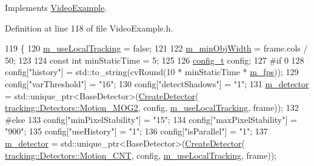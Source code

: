 Implements \mbox{\hyperlink{class_video_example_a93e23d64075fb2f508423e45d15c5421}{Video\+Example}}.



Definition at line 118 of file Video\+Example.\+h.


\begin{DoxyCode}
119     \{
120         \mbox{\hyperlink{class_video_example_a951ee017c4fbb180dfc965a9a35ac69f}{m\_useLocalTracking}} = \textcolor{keyword}{false};
121 
122         \mbox{\hyperlink{class_motion_detector_example_a1ea131c2071f3a7dd87b6c47cdaf997e}{m\_minObjWidth}} = frame.cols / 50;
123 
124         \textcolor{keyword}{const} \textcolor{keywordtype}{int} minStaticTime = 5;
125 
126         \mbox{\hyperlink{defines_8h_a81d657237a541d02f8eeefdd40191920}{config\_t}} config;
127 \textcolor{preprocessor}{#if 0}
128         config[\textcolor{stringliteral}{"history"}] = std::to\_string(cvRound(10 * minStaticTime * \mbox{\hyperlink{class_video_example_ae8110012f8d57f39d6355377cf20fb27}{m\_fps}}));
129         config[\textcolor{stringliteral}{"varThreshold"}] = \textcolor{stringliteral}{"16"};
130         config[\textcolor{stringliteral}{"detectShadows"}] = \textcolor{stringliteral}{"1"};
131         \mbox{\hyperlink{class_video_example_a00fee4b18b68d605b87051f3bdaa1c92}{m\_detector}} = std::unique\_ptr<BaseDetector>(\mbox{\hyperlink{_base_detector_8cpp_a7648f35ed8e9d0160414d8e0eaf99c15}{CreateDetector}}(
      \mbox{\hyperlink{namespacetracking_a1edf574df68abf048988b7cbacc52760a44ff25b64c66d3d3700ffbfa5b8b9330}{tracking::Detectors::Motion\_MOG2}}, config, 
      \mbox{\hyperlink{class_video_example_a951ee017c4fbb180dfc965a9a35ac69f}{m\_useLocalTracking}}, frame));
132 \textcolor{preprocessor}{#else}
133         config[\textcolor{stringliteral}{"minPixelStability"}] = \textcolor{stringliteral}{"15"};
134         config[\textcolor{stringliteral}{"maxPixelStability"}] = \textcolor{stringliteral}{"900"};
135         config[\textcolor{stringliteral}{"useHistory"}] = \textcolor{stringliteral}{"1"};
136         config[\textcolor{stringliteral}{"isParallel"}] = \textcolor{stringliteral}{"1"};
137         \mbox{\hyperlink{class_video_example_a00fee4b18b68d605b87051f3bdaa1c92}{m\_detector}} = std::unique\_ptr<BaseDetector>(\mbox{\hyperlink{_base_detector_8cpp_a7648f35ed8e9d0160414d8e0eaf99c15}{CreateDetector}}(
      \mbox{\hyperlink{namespacetracking_a1edf574df68abf048988b7cbacc52760af40f12386e08503dd5d82774d5e36617}{tracking::Detectors::Motion\_CNT}}, config, 
      \mbox{\hyperlink{class_video_example_a951ee017c4fbb180dfc965a9a35ac69f}{m\_useLocalTracking}}, frame));

\end{DoxyCode}
